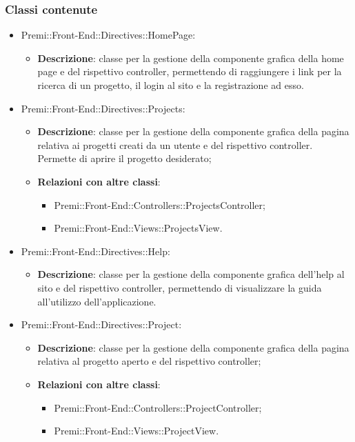 \subsubsection*{Classi contenute}
\begin{itemize}
	\item Premi::Front-End::Directives::HomePage:
	\begin{itemize}
		\item \textbf{Descrizione}: classe per la gestione della componente grafica della home page e del rispettivo controller, permettendo di raggiungere i link per la ricerca di un progetto, il login al sito e la registrazione ad esso.
	\end{itemize}

    \item Premi::Front-End::Directives::Projects:
	\begin{itemize}
		\item \textbf{Descrizione}: classe per la gestione della componente grafica della pagina relativa ai progetti creati da un utente e del rispettivo controller. Permette di aprire il progetto desiderato;
		\item \textbf{Relazioni con altre classi}:
		\begin{itemize}
			\item Premi::Front-End::Controllers::ProjectsController;
			\item Premi::Front-End::Views::ProjectsView.
		\end{itemize}
	\end{itemize}

    \item Premi::Front-End::Directives::Help:
	\begin{itemize}
		\item \textbf{Descrizione}: classe per la gestione della componente grafica dell'help al sito e del rispettivo controller, permettendo di visualizzare la guida all'utilizzo dell'applicazione.
	\end{itemize}

    \item Premi::Front-End::Directives::Project:
	\begin{itemize}
		\item \textbf{Descrizione}: classe per la gestione della componente grafica della pagina relativa al progetto aperto e del rispettivo controller;
		\item \textbf{Relazioni con altre classi}:
		\begin{itemize}
			\item Premi::Front-End::Controllers::ProjectController;
			\item Premi::Front-End::Views::ProjectView.
		\end{itemize}
	\end{itemize}


\end{itemize}
